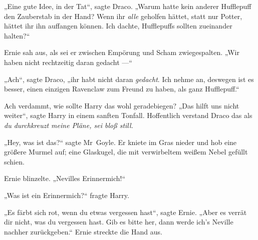 „Eine gute Idee, in der Tat“, sagte Draco.
„Warum hatte kein anderer Hufflepuff den Zauberstab in der Hand? Wenn ihr \emph{alle} geholfen hättet, statt nur Potter, hättet ihr ihn auffangen können. Ich dachte, Hufflepuffs sollten zueinander halten?“

Ernie sah aus, als sei er zwischen Empörung und Scham zwiegespalten.
„Wir haben nicht rechtzeitig daran gedacht —“

„Ach“, sagte Draco, „ihr habt nicht daran \emph{gedacht}. Ich nehme an, deswegen ist es besser, einen einzigen Ravenclaw zum Freund zu haben, als ganz Hufflepuff.“

Ach verdammt, wie sollte Harry das wohl geradebiegen?
„Das hilft uns nicht weiter“, sagte Harry in einem sanften Tonfall. Hoffentlich verstand Draco das als \emph{du durchkreuzt meine Pläne, sei bloß still.}

„Hey, was ist das?“ sagte Mr~Goyle. Er kniete im Gras nieder und hob eine größere Murmel auf; eine Glaskugel, die mit verwirbeltem weißem Nebel gefüllt schien.

Ernie blinzelte.
„Nevilles Erinnermich!“

„Was ist ein Erinnermich?“ fragte Harry.

„Es färbt sich rot, wenn du etwas vergessen hast“, sagte Ernie.
„Aber es verrät dir nicht, was du vergessen hast. Gib es bitte her, dann werde ich’s Neville nachher zurückgeben.“ Ernie streckte die Hand aus.

